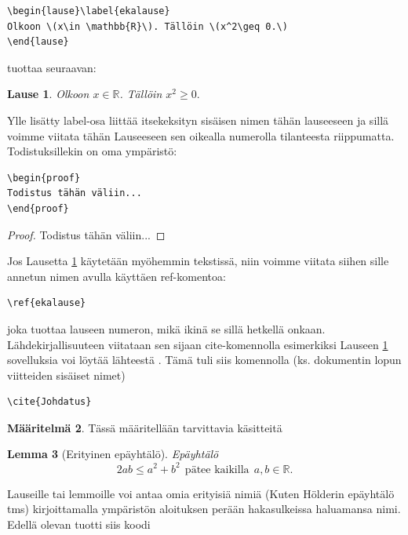 \documentclass[a4paper,12 pt]{article}
\theoremstyle{plain}
\newtheorem{lause}{Lause}[section]
\newtheorem{lemma}[lause]{Lemma}
\theoremstyle{definition}
\newtheorem{maaritelma}[lause]{M\"a\"aritelm\"a}
\theoremstyle{remark}
\numberwithin{equation}{section}
\numberwithin{figure}{section}
\begin{document}
\begin{verbatim}
\begin{lause}\label{ekalause} 
Olkoon \(x\in \mathbb{R}\). Tällöin \(x^2\geq 0.\)
\end{lause}
\end{verbatim}

tuottaa seuraavan:

\begin{lause}\label{ekalause} 
Olkoon \(x\in \mathbb{R}\). Tällöin \(x^2\geq 0.\)
\end{lause}

\noindent Ylle lisätty label-osa liittää itsekeksityn sisäisen nimen tähän lauseeseen ja sillä voimme viitata tähän Lauseeseen sen oikealla numerolla tilanteesta riippumatta. Todistuksillekin on oma ympäristö:

\begin{verbatim}
\begin{proof}
Todistus tähän väliin...
\end{proof}
\end{verbatim}

\begin{proof}
Todistus tähän väliin...
\end{proof}
Jos Lausetta \ref{ekalause} käytetään myöhemmin tekstissä, niin voimme viitata siihen sille annetun nimen avulla käyttäen ref-komentoa:

\begin{verbatim}
\ref{ekalause}
\end{verbatim}
joka tuottaa lauseen numeron, mikä ikinä se sillä hetkellä onkaan.
Lähde\-kirjallisuuteen viitataan sen sijaan cite-komennolla esimerkiksi Lauseen \ref{ekalause} sovelluksia voi löytää lähteestä \cite{Johdatus}. Tämä tuli siis komennolla (ks. dokumentin lopun viitteiden sisäiset nimet)

\begin{verbatim}
\cite{Johdatus}
\end{verbatim}

\begin{maaritelma}
Tässä määritellään tarvittavia käsitteitä
\end{maaritelma}

\begin{lemma}[Erityinen epäyhtälö]
Epäyhtälö
\[2ab\leq a^2+b^2~~\text{pätee kaikilla}\ \ a,b\in\mathbb{R}.\]
\end{lemma}
Lauseille tai lemmoille voi antaa omia erityisiä nimiä (Kuten Hölderin epäyhtälö tms) kirjoittamalla ympäristön aloituksen perään hakasulkeissa haluamansa nimi. Edellä olevan tuotti siis koodi
\end{document}
